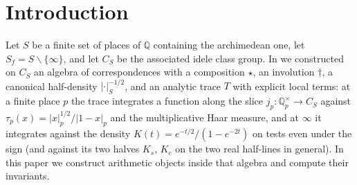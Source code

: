 \documentclass[11pt]{amsart}
\theoremstyle{definition}
\theoremstyle{remark}
\newcommand{\Q}{\mathbb Q}
\begin{document}
\maketitle

\tableofcontents

\section{Introduction}

Let $S$ be a finite set of places of $\Q$ containing the archimedean one, let
$S_f=S\smallsetminus\{\infty\}$, and let $C_S$ be the associated idele class
group.  In \cite{Companion} we constructed on $C_S$ an algebra of
correspondences with a composition $\star$, an involution $\dagger$, a
canonical half-density $|\cdot|_S^{-1/2}$, and an analytic trace $T$ with
explicit local terms: at a finite place $p$ the trace integrates a function
along the slice $j_p:\Q_p^\times\to C_S$ against
$\tau_p(x)=|x|_p^{1/2}/|1-x|_p$ and the multiplicative Haar measure, and at
$\infty$ it integrates against the density $K(t)=e^{-t/2}/(1-e^{-2t})$ on
tests even under the sign (and against its two halves $K_s$, $K_c$ on the two
real half-lines in general).  In
this paper we construct arithmetic objects inside that algebra and compute
their invariants.
\end{document}
